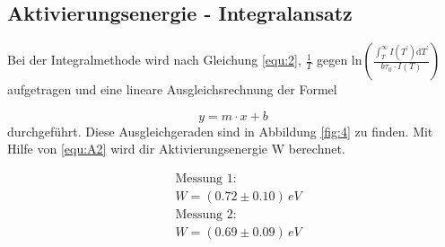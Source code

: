\subsection{Aktivierungsenergie - Integralansatz}
\label{sec:int}

Bei der Integralmethode wird nach Gleichung \ref{equ:2}, $\frac{1}{T}$ gegen $\text{ln} \left( \frac{\int_{T}^{\infty} I(T^{'}) \text{d}T^{'}}{b \tau_0 \cdot I(T)} \right)$ aufgetragen und eine lineare Ausgleichsrechnung der Formel

\begin{equation}
    y = m \cdot x + b
\end{equation}
durchgeführt.
Diese Ausgleichgeraden sind in Abbildung \ref{fig:4} zu finden.
Mit Hilfe von \eqref{equ:A2} wird dir Aktivierungsenergie W berechnet.

\begin{align*}
    &\text{Messung 1:}\\
    & W = (0.72 \pm 0.10) \,eV \\
    &\text{Messung 2:}\\
    & W = (0.69 \pm 0.09) \,eV  \\
\end{align*}


